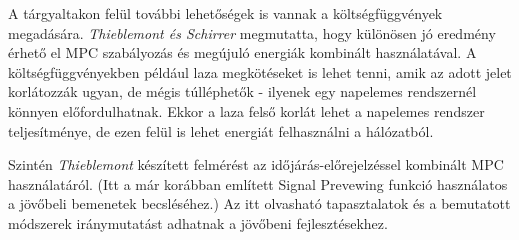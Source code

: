 A tárgyaltakon felül további lehetőségek is vannak a költségfüggvények megadására. \textit{Thieblemont és Schirrer} \cite{SCHIRRER201686} megmutatta, hogy különösen jó eredmény érhető el MPC szabályozás és megújuló energiák kombinált használatával. A költségfüggvényekben például laza megkötéseket is lehet tenni, amik az adott jelet korlátozzák ugyan, de mégis túlléphetők - ilyenek egy napelemes rendszernél könnyen előfordulhatnak. Ekkor a laza felső korlát lehet a napelemes rendszer teljesítménye, de ezen felül is lehet energiát felhasználni a hálózatból.

Szintén \textit{Thieblemont} \cite{THIEBLEMONT2017485} készített felmérést az időjárás-előrejelzéssel kombinált MPC használatáról. (Itt a már korábban említett Signal Prevewing funkció használatos a jövőbeli bemenetek becsléséhez.) Az itt olvasható tapasztalatok és a bemutatott módszerek iránymutatást adhatnak a jövőbeni fejlesztésekhez.


%	
%	
